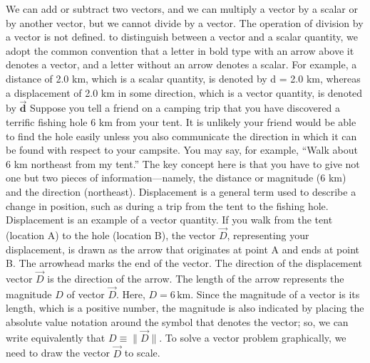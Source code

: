 \documentclass{report}
\begin{document}
    \bigbreak \noindent 
    We can add or subtract two vectors, and we can multiply a vector by a scalar or by another vector, but we cannot divide by a vector. The operation of division by a vector is not defined.
    \bigbreak \noindent 
    to distinguish between a vector and a scalar quantity, we adopt the common convention that a letter in bold type with an arrow above it denotes a vector, and a letter without an arrow denotes a scalar. For example, a distance of 2.0 km, which is a scalar quantity, is denoted by d = 2.0 km, whereas a displacement of 2.0 km in some direction, which is a vector quantity, is denoted by $\vec{\textbf{d}}$
    \bigbreak \noindent 
    Suppose you tell a friend on a camping trip that you have discovered a terrific fishing hole 6 km from your tent. It is unlikely your friend would be able to find the hole easily unless you also communicate the direction in which it can be found with respect to your campsite. You may say, for example, “Walk about 6 km northeast from my tent.” The key concept here is that you have to give not one but two pieces of information—namely, the distance or magnitude (6 km) and the direction (northeast).
    \bigbreak \noindent 
    Displacement is a general term used to describe a change in position, such as during a trip from the tent to the fishing hole. Displacement is an example of a vector quantity. If you walk from the tent (location A) to the hole (location B), the vector $\vec{D}$, representing your displacement, is drawn as the arrow that originates at point A and ends at point B. The arrowhead marks the end of the vector. The direction of the displacement vector $\vec{D}$ is the direction of the arrow. The length of the arrow represents the magnitude $D$ of vector $\vec{D}$. Here, $D = 6\,\text{km}$. Since the magnitude of a vector is its length, which is a positive number, the magnitude is also indicated by placing the absolute value notation around the symbol that denotes the vector; so, we can write equivalently that $D \equiv \lVert \vec{D} \rVert$. To solve a vector problem graphically, we need to draw the vector $\vec{D}$ to scale.
\end{document}
